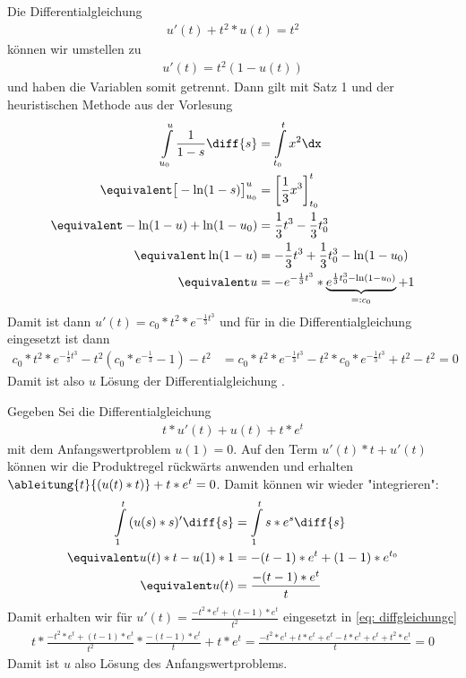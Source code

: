 \begin{exercisePage}
	Die Differentialgleichung 
	\begin{align} \label{eq: diffgleichungb}
	u'(t) + t^2*u(t) = t^2
	\end{align}
	können wir umstellen zu
	\begin{align*}
	u'(t) = t^2 (1 - u(t))
	\end{align*}
	und haben die Variablen somit getrennt. Dann gilt mit Satz 1 und der heuristischen Methode aus der Vorlesung
	\begin{align*}
	\int \limits_{u_0}^{u}{\frac{1}{1-s} \diff{s}} 
	&= \int \limits_{t_0}^{t}{x^2 \dx} \\
	\equivalent \big[ - \ln(1-s) \big]_{u_0}^{u} &= \left[ \frac{1}{3} x^3 \right]_{t_0}^{t} \\
	\equivalent - \ln(1-u) + \ln(1-u_0) &= \frac{1}{3} t^3 - \frac{1}{3} t_0^3 \\ 
	\equivalent \ln(1-u) &= - \frac{1}{3} t^3 + \frac{1}{3} t_0^3 - \ln(1-u_0) \\
	\equivalent u &= -e^{-\frac{1}{3}t^3} * \underbrace{e^{\frac{1}{3} t_0^3 - \ln(1-u_0)}}_{=: c_0} + 1
	\end{align*}
	Damit ist dann $u'(t) = c_0 * t^2 * e^{-\frac{1}{3}t^3}$ und für in die Differentialgleichung eingesetzt ist dann
	\begin{align*}
	c_0 * t^2 * e^{-\frac{1}{3}t^3} - t^2 (c_0*e^{-\frac{1}{3}}-1) - t^2
	&= c_0*t^2 * e^{-\frac{1}{3}t^3} - t^2 * c_0 * e^{-\frac{1}{3}t^3} + t^2 -t^2 = 0
	\end{align*}
	Damit ist also $u$ Lösung der Differentialgleichung .
	
	\pagebreak
	Gegeben Sei die Differentialgleichung
	\begin{align} \label{eq: diffgleichungc}
	t*u'(t) + u(t) + t*e^t
	\end{align}
	mit dem Anfangswertproblem $u(1)=0$. Auf den Term $u'(t)*t + u'(t)$ können wir die Produktregel rückwärts anwenden und erhalten $\ableitung{t}{(u(t) * t)} + t*e^t = 0$. Damit können wir wieder "integrieren":
	\begin{align*}
	\int \limits_1^{t}{(u(s) * s)' \diff{s}} &= \int \limits_1^t{s * e^s \diff{s}} \\
	\equivalent u(t) * t - u(1)*1 &= -(t-1)*e^t+(1-1)*e^{t_0} \\
	\equivalent u(t) &= \frac{-(t-1)*e^t}{t}
	\end{align*}
	Damit erhalten wir für $u'(t) = \frac{-t^2*e^t + (t-1) *e^t}{t^2}$ eingesetzt in \cref{eq: diffgleichungc} 
	\begin{align*}
	t * \frac{-t^2*e^t+(t-1)*e^t}{t^2} * \frac{-(t-1)*e^t}{t} + t*e^t = \frac{-t^2*e^t+t*e^t+e^t-t*e^t+e^t+t^2*e^t}{t} = 0
	\end{align*}
	Damit ist $u$ also Lösung des Anfangswertproblems.
	

\end{exercisePage}
